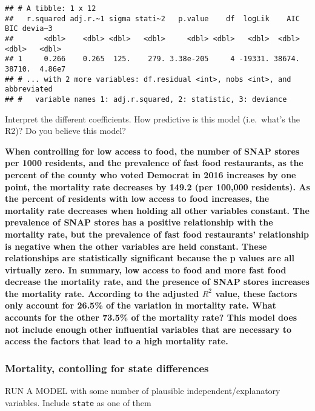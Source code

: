\documentclass[
]{article}
\begin{document}
\begin{verbatim}
## # A tibble: 1 x 12
##   r.squared adj.r.~1 sigma stati~2   p.value    df  logLik    AIC    BIC devia~3
##       <dbl>    <dbl> <dbl>   <dbl>     <dbl> <dbl>   <dbl>  <dbl>  <dbl>   <dbl>
## 1     0.266    0.265  125.    279. 3.38e-205     4 -19331. 38674. 38710.  4.86e7
## # ... with 2 more variables: df.residual <int>, nobs <int>, and abbreviated
## #   variable names 1: adj.r.squared, 2: statistic, 3: deviance
\end{verbatim}

Interpret the different coefficients. How predictive is this model
(i.e.~what's the R2)? Do you believe this model?

\textbf{When controlling for low access to food, the number of SNAP
stores per 1000 residents, and the prevalence of fast food restaurants,
as the percent of the county who voted Democrat in 2016 increases by one
point, the mortality rate decreases by 149.2 (per 100,000 residents). As
the percent of residents with low access to food increases, the
mortality rate decreases when holding all other variables constant. The
prevalence of SNAP stores has a positive relationship with the mortality
rate, but the prevalence of fast food restaurants' relationship is
negative when the other variables are held constant. These relationships
are statistically significant because the p values are all virtually
zero. In summary, low access to food and more fast food decrease the
mortality rate, and the presence of SNAP stores increases the mortality
rate. According to the adjusted \(R^2\) value, these factors only
account for 26.5\% of the variation in mortality rate. What accounts for
the other 73.5\% of the mortality rate? This model does not include
enough other influential variables that are necessary to access the
factors that lead to a high mortality rate.}

\hypertarget{mortality-contolling-for-state-differences}{%
\subsubsection{Mortality, contolling for state
differences}\label{mortality-contolling-for-state-differences}}

RUN A MODEL with some number of plausible independent/explanatory
variables. Include \texttt{state} as one of them
\end{document}
